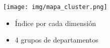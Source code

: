 \documentclass[aspectratio=169]{beamer}
\begin{document}
    \begin{slide}{18} 
            \begin{imagecolumn}
                \texttt{[image: img/mapa\_cluster.png]}
            \end{imagecolumn}
            \begin{textcolumn}
                \begin{itemize}
                    \item Índice por cada dimensión
                    \item 4 grupos de departamentos
                \end{itemize}
            \end{textcolumn}
    \printcolumns
    \end{slide}
    
    
    
   
\end{document}
